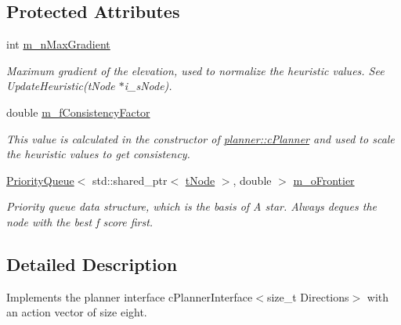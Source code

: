 \subsection*{Protected Attributes}
\begin{DoxyCompactItemize}
\item 
\mbox{\label{classplanner_1_1c_planner_af76b294d4e75b4e5d636bca4a795d2e4}} 
int \mbox{\hyperlink{classplanner_1_1c_planner_af76b294d4e75b4e5d636bca4a795d2e4}{m\+\_\+n\+Max\+Gradient}}
\begin{DoxyCompactList}\small\item\em Maximum gradient of the elevation, used to normalize the heuristic values. See Update\+Heuristic(t\+Node $\ast$i\+\_\+s\+Node). \end{DoxyCompactList}\item 
\mbox{\label{classplanner_1_1c_planner_ac9f4be1c679321a2f6bc5d1a1102b3c2}} 
double \mbox{\hyperlink{classplanner_1_1c_planner_ac9f4be1c679321a2f6bc5d1a1102b3c2}{m\+\_\+f\+Consistency\+Factor}}
\begin{DoxyCompactList}\small\item\em This value is calculated in the constructor of \mbox{\hyperlink{classplanner_1_1c_planner}{planner\+::c\+Planner}} and used to scale the heuristic values to get consistency. \end{DoxyCompactList}\item 
\mbox{\label{classplanner_1_1c_planner_a1c212bac80800ef51aacaa63fce32a2a}} 
\mbox{\hyperlink{structplanner_1_1_priority_queue}{Priority\+Queue}}$<$ std\+::shared\+\_\+ptr$<$ \mbox{\hyperlink{structplanner_1_1t_node}{t\+Node}} $>$, double $>$ \mbox{\hyperlink{classplanner_1_1c_planner_a1c212bac80800ef51aacaa63fce32a2a}{m\+\_\+o\+Frontier}}
\begin{DoxyCompactList}\small\item\em Priority queue data structure, which is the basis of A star. Always deques the node with the best f score first. \end{DoxyCompactList}\end{DoxyCompactItemize}


\subsection{Detailed Description}
Implements the planner interface c\+Planner\+Interface$<$size\+\_\+t Directions$>$ with an action vector of size eight. 

